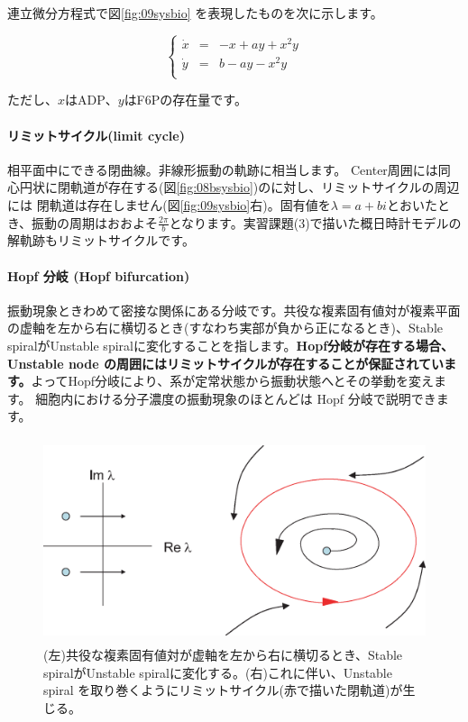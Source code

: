 連立微分方程式で図\ref{fig:09sysbio} を表現したものを次に示します。

\[
\left\{
\begin{array}{lclclll}
\dot x & = & -x+ay+x^2 y\\
\dot y & = & b-ay-x^2y\\
\end{array}
\right.\]

ただし、\(x\)はADP、\(y\)はF6Pの存在量です。

\paragraph{リミットサイクル(limit cycle)} 相平面中にできる閉曲線。非線形振動の軌跡に相当します。
Center周囲には同心円状に閉軌道が存在する(図\ref{fig:08bsysbio})のに対し、リミットサイクルの周辺には
閉軌道は存在しません(図\ref{fig:09sysbio}右)。固有値を\(\lambda = a+bi\)とおいたとき、振動の周期はおおよそ\(\displaystyle\frac{2\pi}{b}\)となります。実習課題(3)で描いた概日時計モデルの解軌跡もリミットサイクルです。

\paragraph{Hopf 分岐 (Hopf bifurcation)}
振動現象ときわめて密接な関係にある分岐です。共役な複素固有値対が複素平面の虚軸を左から右に横切るとき(すなわち実部が負から正になるとき)、Stable spiralがUnstable spiralに変化することを指します。{\bf Hopf分岐が存在する場合、Unstable node の周囲にはリミットサイクルが存在することが保証されています。}よってHopf分岐により、系が定常状態から振動状態へとその挙動を変えます。
細胞内における分子濃度の振動現象のほとんどは Hopf 分岐で説明できます。

\begin{figure}[ht]
        \centering \includegraphics[height=6cm]{../Bifurcation/img/hopf_limitcycle.eps}
        \caption{(左)共役な複素固有値対が虚軸を左から右に横切るとき、Stable spiralがUnstable spiralに変化する。(右)これに伴い、Unstable spiral を取り巻くようにリミットサイクル(赤で描いた閉軌道)が生じる。}
        \label{fig:10sysbio} \end{figure}


